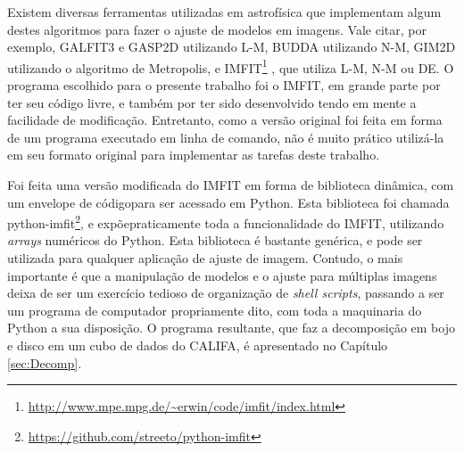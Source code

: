 Existem diversas ferramentas utilizadas em astrofísica que implementam algum
destes algoritmos para fazer o ajuste de modelos em imagens. Vale citar, por
exemplo, GALFIT3 \citep{Peng2010} e GASP2D \citep{MendezAbreu2008} utilizando
L-M, BUDDA \citep{DeSouza2004} utilizando N-M, GIM2D \citep{Simard2002}
utilizando o algoritmo de Metropolis, e
IMFIT\footnote{\url{http://www.mpe.mpg.de/~erwin/code/imfit/index.html}}
\citet{Erwin2015}, que utiliza L-M, N-M ou DE. O programa escolhido para o
presente trabalho foi o IMFIT, em grande parte por ter seu código livre, e
também por ter sido desenvolvido tendo em mente a facilidade de modificação.
Entretanto, como a versão original foi feita em forma de um programa executado
em linha de comando, não é muito prático utilizá-la em seu formato original para
implementar as tarefas deste trabalho.

Foi feita uma versão modificada do IMFIT em forma de biblioteca dinâmica, com um
envelope de código\fixme para ser acessado em Python. Esta biblioteca foi
chamada python-imfit\footnote{\url{https://github.com/streeto/python-imfit}}, e
expõe\fixme praticamente toda a funcionalidade do IMFIT, utilizando {\em arrays}
numéricos do Python. Esta biblioteca é bastante genérica, e pode ser utilizada
para qualquer aplicação de ajuste de imagem. Contudo, o mais importante é que a
manipulação de modelos e o ajuste para múltiplas imagens deixa de ser um
exercício tedioso de organização de {\em shell scripts}\fixme, passando a ser um
programa de computador propriamente dito, com toda a maquinaria do Python a sua
disposição. O programa resultante, que faz a decomposição em bojo e disco em um
cubo de dados do CALIFA, é apresentado no Capítulo \ref{sec:Decomp}.

